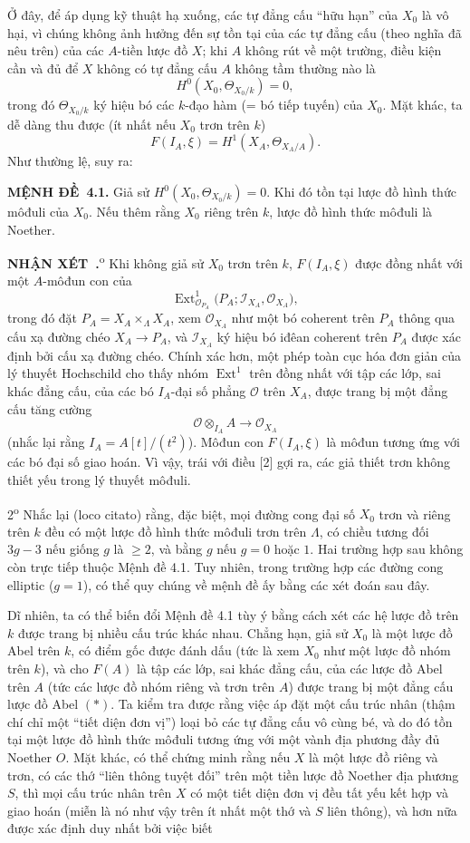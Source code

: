 \documentclass[11pt,twoside,openany]{book}
\numberwithin{equation}{section}
\newcommand{\src}[1]{%
  \phantomsection\hypertarget{src:\fgasourceid:#1}{}%
  \marginpar{\raggedleft\footnotesize\sffamily #1}%
}
\newcommand{\fgasourceid}{unset}
\newcommand{\result}[2]{\par\medskip\noindent\textbf{#1\if\relax\detokenize{#2}\relax\else\ #2\fi.}\quad}
\begin{document}
Ở đây, để áp dụng kỹ thuật hạ xuống, các tự đẳng cấu ``hữu hạn'' của $X_0$ là
vô hại, vì chúng không ảnh hưởng đến sự tồn tại của các tự đẳng cấu (theo
nghĩa đã nêu trên) của các $A$-tiền lược đồ $X$; khi $A$ không rút về một
trường, điều kiện cần và đủ để $X$ không có tự đẳng cấu $A$ không tầm thường
nào là
\[
  H^0(X_0,\Theta_{X_0/k})=0,
\]
trong đó $\Theta_{X_0/k}$ ký hiệu bó các $k$-đạo hàm (= bó tiếp tuyến) của
$X_0$. Mặt khác, ta dễ dàng thu được (ít nhất nếu $X_0$ trơn trên $k$)
\[
  F(I_A,\xi)=H^1(X_A,\Theta_{X_A/A}).
\]
Như thường lệ, suy ra:

\src{386}
\result{MỆNH ĐỀ}{4.1} Giả sử
$H^0(X_0,\Theta_{X_0/k})=0$. Khi đó tồn tại lược đồ hình thức môđuli của
$X_0$. Nếu thêm rằng $X_0$ riêng trên $k$, lược đồ hình thức môđuli là
Noether.

\result{NHẬN XÉT}{} 1\textsuperscript{o} Khi không giả sử $X_0$ trơn trên
$k$, $F(I_A,\xi)$ được đồng nhất với một $A$-môđun con của
\[
  \operatorname{Ext}^1_{\mathcal O_{P_A}}
  \bigl(P_A;\mathcal I_{X_A},\mathcal O_{X_A}\bigr),
\]
trong đó đặt $P_A=X_A\times_\Lambda X_A$, xem $\mathcal O_{X_A}$ như một bó
coherent trên $P_A$ thông qua cấu xạ đường chéo
$X_A\longrightarrow P_A$, và $\mathcal I_{X_A}$ ký hiệu bó iđêan coherent
trên $P_A$ được xác định bởi cấu xạ đường chéo. Chính xác hơn, một phép toàn
cục hóa đơn giản của lý thuyết Hochschild cho thấy nhóm
$\operatorname{Ext}^1$ trên đồng nhất với tập các lớp, sai khác đẳng cấu, của
các bó $I_A$-đại số phẳng $\mathcal O$ trên $X_A$, được trang bị một đẳng cấu
tăng cường
\[
  \mathcal O\otimes_{I_A}A\longrightarrow\mathcal O_{X_A}
\]
(nhắc lại rằng $I_A=A[t]/(t^2)$). Môđun con $F(I_A,\xi)$ là môđun tương ứng
với các bó đại số giao hoán. Vì vậy, trái với điều [2] gợi ra, các giả thiết
trơn không thiết yếu trong lý thuyết môđuli.

2\textsuperscript{o} Nhắc lại (loco citato) rằng, đặc biệt, mọi đường cong đại
số $X_0$ trơn và riêng trên $k$ đều có một lược đồ hình thức môđuli trơn trên
$\Lambda$, có chiều tương đối $3g-3$ nếu giống $g$ là $\geq2$, và bằng $g$ nếu
$g=0$ hoặc $1$. Hai trường hợp sau không còn trực tiếp thuộc Mệnh đề 4.1. Tuy
nhiên, trong trường hợp các đường cong elliptic ($g=1$), có thể quy chúng về
mệnh đề ấy bằng các xét đoán sau đây.

Dĩ nhiên, ta có thể biến đổi Mệnh đề 4.1 tùy ý bằng cách xét các hệ lược đồ
trên $k$ được trang bị nhiều cấu trúc khác nhau. Chẳng hạn, giả sử $X_0$ là
một lược đồ Abel trên $k$, có điểm gốc được đánh dấu (tức là xem $X_0$ như một
lược đồ nhóm trên $k$), và cho $F(A)$ là tập các lớp, sai khác đẳng cấu, của
các lược đồ Abel trên $A$ (tức các lược đồ nhóm riêng và trơn trên $A$) được
trang bị một đẳng cấu lược đồ Abel $(*)$. Ta kiểm tra được rằng việc áp đặt một
cấu trúc nhân (thậm chí chỉ một ``tiết diện đơn vị'') loại bỏ các tự đẳng cấu
vô cùng bé, và do đó tồn tại một lược đồ hình thức môđuli tương ứng với một
vành địa phương đầy đủ Noether $O$. Mặt khác, có thể chứng minh rằng nếu $X$
là một lược đồ riêng và trơn, có các thớ ``liên thông tuyệt đối'' trên một tiền
lược đồ Noether địa phương $S$, thì mọi cấu trúc nhân trên $X$ có một tiết
diện đơn vị đều tất yếu kết hợp và giao hoán (miễn là nó như vậy trên ít nhất
một thớ và $S$ liên thông), và hơn nữa được xác định duy nhất bởi việc biết
\end{document}
